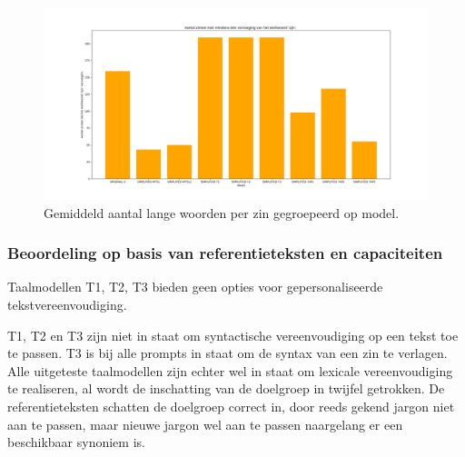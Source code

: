 \begin{figure}
	\includegraphics[width=\linewidth]{img/boxplot-tobe-a2.png}
	\caption{Gemiddeld aantal lange woorden per zin gegroepeerd op model.}
	\label{img:histplot-tobe-a2}
\end{figure}




\subsubsection{Beoordeling op basis van referentieteksten en capaciteiten}

Taalmodellen T1, T2, T3 bieden geen opties voor gepersonaliseerde tekstvereenvoudiging. 

T1, T2 en T3 zijn niet in staat om syntactische vereenvoudiging op een tekst toe te passen. T3 is bij alle prompts in staat om de syntax van een zin te verlagen. Alle uitgeteste taalmodellen zijn echter wel in staat om lexicale vereenvoudiging te realiseren, al wordt de inschatting van de doelgroep in twijfel getrokken. De referentieteksten schatten de doelgroep correct in, door reeds gekend jargon niet aan te passen, maar nieuwe jargon wel aan te passen naargelang er een beschikbaar synoniem is. 

\medspace

